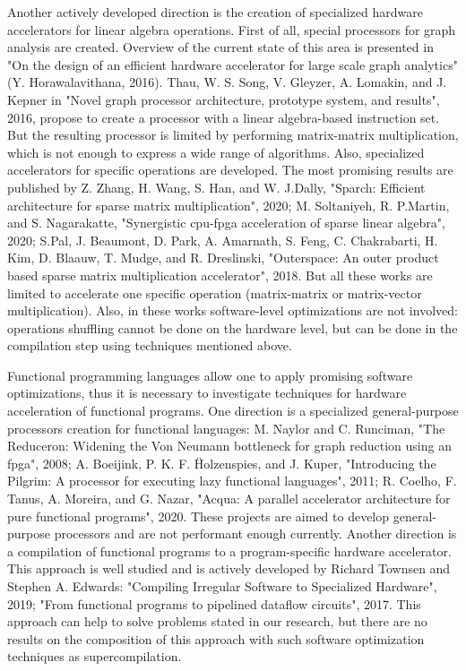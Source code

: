 \documentclass[12pt]{article}  %
\theoremstyle{remark}
\begin{document}
Another actively developed direction is the creation of specialized hardware accelerators for linear algebra operations. First of all, special processors for graph analysis are created. Overview of the current state of this area is presented in "On the design of an efficient hardware accelerator for large scale graph analytics" (Y. Horawalavithana, 2016). Thau, W. S. Song, V. Gleyzer, A. Lomakin, and J. Kepner in "Novel graph processor architecture, prototype system, and results", 2016, propose to create a processor with a linear algebra-based instruction set. But the resulting processor is limited by performing matrix-matrix multiplication, which is not enough to express a wide range of algorithms. Also, specialized accelerators for specific operations are developed. The most promising results are published by  Z. Zhang, H. Wang, S. Han, and W. J.Dally, "Sparch: Efficient architecture for sparse matrix multiplication", 2020; M. Soltaniyeh, R. P.Martin, and S. Nagarakatte, "Synergistic cpu-fpga acceleration of sparse linear algebra", 2020; S.Pal, J. Beaumont, D. Park, A. Amarnath, S. Feng, C. Chakrabarti, H. Kim, D. Blaauw, T. Mudge, and R. Dreslinski, "Outerspace: An outer product based sparse matrix multiplication accelerator", 2018. But all these works are limited to accelerate one specific operation (matrix-matrix or matrix-vector multiplication). Also, in these works software-level optimizations are not involved: operations shuffling cannot be done on the hardware level, but can be done in the compilation step using techniques mentioned above.

Functional programming languages allow one to apply promising software optimizations, thus it is necessary to investigate techniques for hardware acceleration of functional programs. One direction is a specialized general-purpose processors creation for functional languages: M. Naylor and C. Runciman, "The Reduceron: Widening the Von Neumann bottleneck for graph reduction using an fpga", 2008; A. Boeijink, P. K. F. Ḧolzenspies, and J. Kuper, "Introducing the Pilgrim: A processor for executing lazy functional languages", 2011; R. Coelho, F. Tanus, A. Moreira, and G. Nazar, "Acqua: A parallel accelerator architecture for pure functional programs", 2020. These projects are aimed to develop general-purpose processors and are not performant enough currently. Another direction is a compilation of functional programs to a program-specific hardware accelerator. This approach is well studied and is actively developed by Richard Townsen and Stephen A. Edwards: "Compiling Irregular Software to Specialized Hardware", 2019; "From functional programs to pipelined dataflow circuits", 2017. This approach can help to solve problems stated in our research, but there are no results on the composition of this approach with such software optimization techniques as supercompilation.
\end{document}
